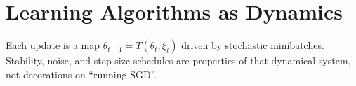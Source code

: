 \chapter{Learning Algorithms as Dynamics}
\label{ch:learning-dynamics}

Each update is a map $\theta_{t+1} = T(\theta_t, \xi_t)$ driven by stochastic minibatches. Stability, noise, and step-size schedules are properties of that dynamical system, not decorations on ``running SGD''.
